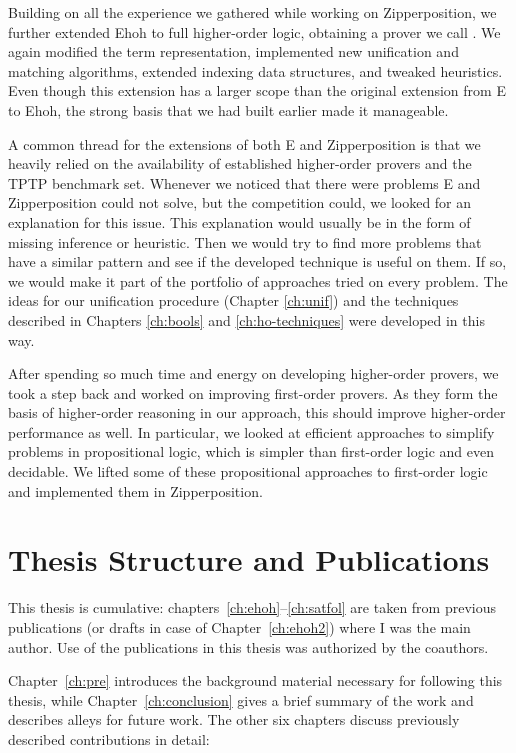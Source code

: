   Building on all the experience we gathered while working on Zipperposition,
  we further extended Ehoh to full higher-order logic, obtaining a prover we call
  \newehoh{}. We again modified the term representation, implemented new unification and
  matching algorithms, extended indexing data structures, and tweaked
  heuristics. Even though this extension has a larger scope than the original
  extension from E to Ehoh, the strong basis that we had built earlier made it
  manageable.
  \pagebreak[2]

  A common thread for the extensions of both E and Zipperposition is that we
  heavily relied on the availability of established higher-order provers and the
  TPTP benchmark set. Whenever we noticed that there were problems E and
  Zipperposition could not solve, but the competition could, we looked for an
  explanation for this issue. This explanation would usually be in the form of
  missing inference or heuristic. Then we would try to find more problems that
  have a similar pattern and see if the developed technique is useful on them.
  If so, we would make it part of the portfolio of approaches tried on every
  problem. The ideas for our unification procedure (Chapter \ref{ch:unif}) and
  the techniques described in Chapters \ref{ch:bools} and \ref{ch:ho-techniques}
  were developed in this way.
  
  After spending so much time and energy on developing higher-order provers, we
  took a step back and worked on improving first-order provers. As they form the
  basis of higher-order reasoning in our approach, this should improve
  higher-order performance as well. In particular, we looked at efficient
  approaches to simplify problems in propositional logic, which is simpler than
  first-order logic and even decidable. We lifted some of these propositional
  approaches to first-order logic and implemented them in Zipperposition. 

\section{Thesis Structure and Publications}

This thesis is cumulative: chapters~\ref{ch:ehoh}--\ref{ch:satfol}  are
taken from previous publications (or drafts in case of
Chapter~\ref{ch:ehoh2}) where I was the main author. Use
of the publications in this thesis was authorized by the coauthors. 

Chapter~\ref{ch:pre} introduces the background material necessary for following this thesis,
while Chapter~\ref{ch:conclusion} gives a brief summary of the work and describes alleys for future work.
The other six chapters discuss previously described contributions in detail:

